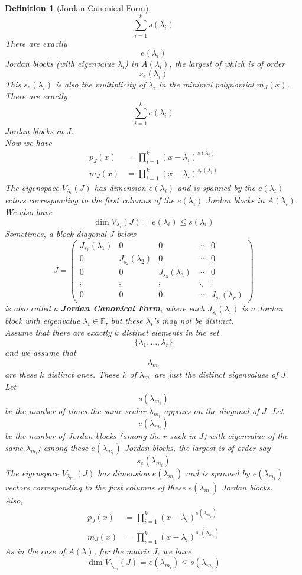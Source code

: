 \documentclass[12pt]{article}
\newtheorem{definition}{Definition}[section]
\theoremstyle{definition}
\begin{document}
\begin{definition}[Jordan Canonical Form]
\[
\sum_{i=1}^k s(\lambda_i)
\]
There are exactly
\[
e(\lambda_i)
\]
Jordan blocks (with eigenvalue $\lambda_i$) in $A(\lambda_i)$, the largest of which is of order
\[
s_e(\lambda_i)
\]
This $s_e(\lambda_i)$ is also the multiplicity of $\lambda_i$ in the minimal polynomial $m_J(x)$.\\
There are exactly
\[
\sum_{i=1}^k e(\lambda_i)
\]
Jordan blocks in $J$.\\
Now we have
\[
\begin{aligned}
p_J(x)&=\prod_{i=1}^k(x-\lambda_i)^{s(\lambda_i)}\\
m_J(x)&=\prod_{i=1}^k(x-\lambda_i)^{s_e(\lambda_i)}
\end{aligned}
\]
The eigenspace $V_{\lambda_i}(J)$ has dimension $e(\lambda_i)$ and is spanned by the $e(\lambda_i)$ ectors corresponding to the first columns of the $e(\lambda_i)$ Jordan blocks in $A(\lambda_i)$.\\
We also have
\[
\dim V_{\lambda_i}(J)=e(\lambda_i)\leq s(\lambda_i)
\]
Sometimes, a block diagonal $J$ below
\[
J=\begin{pmatrix}
J_{s_1}(\lambda_1)&0&0&\cdots&0\\
0&J_{s_2}(\lambda_2)&0&\cdots&0\\
0&0&J_{s_3}(\lambda_3)&\cdots&0\\
\vdots&\vdots&\vdots&\ddots&\vdots\\
0&0&0&\cdots&J_{s_r}(\lambda_r)
\end{pmatrix}
\]
is also called a \textbf{Jordan Canonical Form}, where each $J_{s_i}(\lambda_i)$ is a Jordan block with eigenvalue $\lambda_i\in\mathbb{F}$, but these $\lambda_i$'s may not be distinct.\\
Assume that there are exactly $k$ distinct elements in the set 
\[
\{\lambda_1,\ldots,\lambda_r\}
\]
and we assume that 
\[
\lambda_{m_i}
\]
are these $k$ distinct ones. These $k$ of $\lambda_{m_i}$ are just the distinct eigenvalues of $J$.\\
Let
\[
s(\lambda_{m_i})
\]
be the number of times the same scalar $\lambda_{m_i}$ appears on the diagonal of $J$.
Let 
\[
e(\lambda_{m_i})
\]
be the number of Jordan blocks (among the $r$ such in $J$) with eigenvalue of the same $\lambda_{m_i}$; among these $e(\lambda_{m_i})$ Jordan blocks, the largest is of order say
\[
s_e(\lambda_{m_i})
\]
The eigenspace $V_{\lambda_{m_i}}(J)$ has dimension $e(\lambda_{m_i})$ and is spanned by $e(\lambda_{m_i})$ vectors corresponding to the first columns of these $e(\lambda_{m_i})$ Jordan blocks.\\
Also,
\[
\begin{aligned}
p_J(x)&=\prod_{i=1}^k(x-\lambda_i)^{s(\lambda_{m_i})}\\
m_J(x)&=\prod_{i=1}^k(x-\lambda_i)^{s_e(\lambda_{m_i})}
\end{aligned}
\]
As in the case of $A(\lambda)$, for the matrix $J$, we have
\[
\dim V_{\lambda_{m_i}}(J)=e(\lambda_{m_i})\leq s(\lambda_{m_i})
\]
\end{definition}
\end{document}
